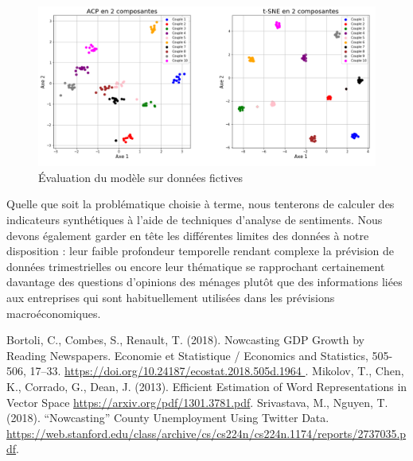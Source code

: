 \documentclass[11pt,french,french]{article}
\begin{document}
\begin{figure}
\centering
\includegraphics[width=1\textwidth]{figures.png}
\captionsetup{margin=0cm,format=hang,justification=justified}
\caption{Évaluation du modèle sur données fictives}\label{fig:figure_evaluation}
\end{figure}

Quelle que soit la problématique choisie à terme, nous tenterons de
calculer des indicateurs synthétiques à l'aide de techniques d'analyse
de sentiments. Nous devons également garder en tête les différentes
limites des données à notre disposition : leur faible profondeur
temporelle rendant complexe la prévision de données trimestrielles ou
encore leur thématique se rapprochant certainement davantage des
questions d'opinions des ménages plutôt que des informations liées aux
entreprises qui sont habituellement utilisées dans les prévisions
macroéconomiques.

\nocite{*}

\begin{thebibliography}{999}
 Bortoli, C., Combes, S., Renault, T. (2018). Nowcasting GDP Growth by Reading Newspapers. Economie et Statistique / Economics and Statistics, 505-506, 17–33. \url{https://doi.org/10.24187/ecostat.2018.505d.1964 }.
Mikolov, T.,  Chen, K., Corrado, G., Dean, J. (2013). Efficient Estimation of Word Representations in Vector Space \url{https://arxiv.org/pdf/1301.3781.pdf}.
Srivastava, M., Nguyen, T. (2018). “Nowcasting” County Unemployment Using Twitter Data. \url{https://web.stanford.edu/class/archive/cs/cs224n/cs224n.1174/reports/2737035.pdf}.
\end{thebibliography}
\end{document}
